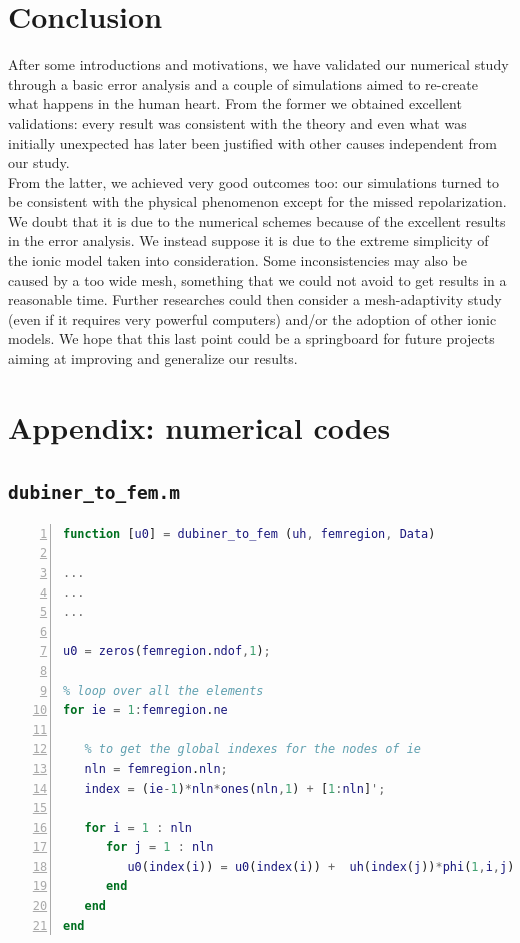 \documentclass[a4paper,11pt]{article}
\begin{document}
\section{Conclusion}
After some introductions and motivations, we have validated our numerical study through a basic error analysis and a couple of simulations aimed to re-create what happens in the human heart.
\noindent From the former we obtained excellent validations: every result was consistent with the theory and even what was initially unexpected has later been justified with other causes independent from our study.\\
\noindent From the latter, we achieved very good outcomes too: our simulations turned to be consistent with the physical phenomenon except for the missed repolarization. We doubt that it is due to the numerical schemes because of the excellent results in the error analysis. We instead suppose it is due to the extreme simplicity of the ionic model taken into consideration. Some inconsistencies may also be caused by a too wide mesh, something that we could not avoid to get results in a reasonable time. Further researches could then consider a mesh-adaptivity study (even if it requires very powerful computers) and/or the adoption of other ionic models.
\noindent We hope that this last point could be a springboard for future projects aiming at improving and generalize our results. 
\section{Appendix: numerical codes}
\subsection{\texttt{dubiner\_to\_fem.m}}\label{dub_to_fem}
\begin{lstlisting}[language=Matlab,basicstyle=\small, numbers=left, numberstyle=\tiny,  name = dubiner_to_fem.m, frame=single]
function [u0] = dubiner_to_fem (uh, femregion, Data)  
	
...
...
...
	
u0 = zeros(femregion.ndof,1);
	
% loop over all the elements
for ie = 1:femregion.ne
	
   % to get the global indexes for the nodes of ie 
   nln = femregion.nln;
   index = (ie-1)*nln*ones(nln,1) + [1:nln]';
	
   for i = 1 : nln
      for j = 1 : nln
         u0(index(i)) = u0(index(i)) +  uh(index(j))*phi(1,i,j);
      end
   end
end
\end{lstlisting} 
\end{document}
